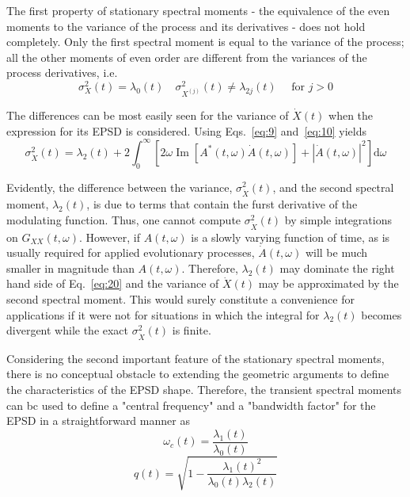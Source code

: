 \documentclass[12pt]{article}
\begin{document}
The first property of stationary spectral moments - the equivalence of the even moments to the variance of the process and its derivatives - does not hold completely. Only the first spectral moment is equal to the variance of the process; all the other moments of even order are different from the variances of the process derivatives, i.e.
\begin{equation}
\sigma_{X}^{2}(t)=\lambda_{0}(t) \quad \sigma_{X^{(j)}}^{2}(t) \neq \lambda_{2 j}(t) \quad \text { for } j>0
\label{eq:19}
\end{equation}

The differences can be most easily seen for the variance of $\dot{X}(t)$ when the expression for its EPSD is considered. Using Eqs.~\eqref{eq:9} and~\eqref{eq:10} yields
\begin{equation}
\sigma_{\dot{X}}^{2}(t)=\lambda_{2}(t)+2 \int_{0}^{\infty}\left[2 \omega \operatorname{Im}\left[A^{*}(t, \omega) \dot{A}(t, \omega)\right]+|\dot{A}(t, \omega)|^{2}\right] \mathrm{d} \omega
\label{eq:20}
\end{equation}

Evidently, the difference between the variance, $\sigma_{\dot{X}}^{2}(t)$, and the second spectral moment, $\lambda_{2}(t)$, is due to terms that contain the furst derivative of the modulating function. Thus, one cannot compute $\sigma_{\dot{X}}^{2}(t)$ by simple integrations on $G_{X X}(t, \omega)$. However, if $A(t, \omega)$ is a slowly varying function of time, as is usually required for applied evolutionary processes, $\dot{A}(t, \omega)$ will be much smaller in magnitude than $A(t, \omega)$. Therefore, $\lambda_{2}(t)$ may dominate the right hand side of Eq.~\eqref{eq:20} and the variance of $\dot{X}(t)$ may be approximated by the second spectral moment. This would surely constitute a convenience for applications if it were not for situations in which the integral for $\lambda_{2}(t)$ becomes divergent while the exact $\sigma_{\dot{X}}^{2}(t)$ is finite.

Considering the second important feature of the stationary spectral moments, there is no conceptual obstacle to extending the geometric arguments to define the characteristics of the EPSD shape. Therefore, the transient spectral moments can bc used to define a "central frequency" and a "bandwidth factor" for the EPSD in a straightforward manner as
\begin{equation}
\omega_{c}(t)=\frac{\lambda_{1}(t)}{\lambda_{0}(t)}
\label{eq:21}
\end{equation}
\begin{equation}
q(t)=\sqrt{1-\frac{\lambda_{1}(t)^{2}}{\lambda_{0}(t) \lambda_{2}(t)}}
\label{eq:22}
\end{equation}
\end{document}
